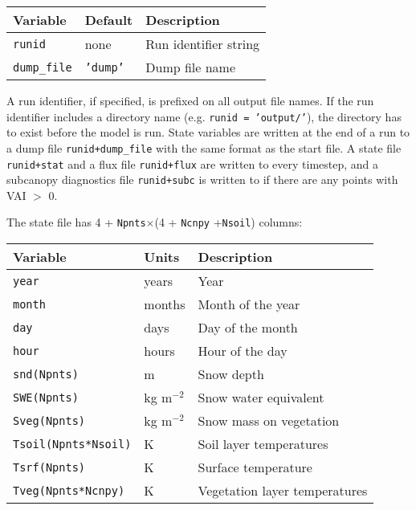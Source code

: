 \documentclass{article}
\begin{document}
\begin{longtable}{|l|l|l|}
\hline
Variable         & Default      & Description                            \\ \hline
{\tt runid}      & none         & Run identifier string                  \\
{\tt dump\_file} & {\tt 'dump'} & Dump file name                         \\ \hline 
\end{longtable}

A run identifier, if specified, is prefixed on all output file names. If the run identifier includes a directory name (e.g. {\tt runid = 'output/'}), the directory has to exist before the model is run. State variables are written at the end of a run to a dump file {\tt runid+dump\_file} with the same format as the start file. A state file {\tt runid+stat} and a flux file {\tt runid+flux} are written to every timestep, and a subcanopy diagnostics file {\tt runid+subc} is written to if there are any points with VAI $>$ 0.

The state file has 4 + {\tt Npnts}$\times$(4 + {\tt Ncnpy} +{\tt Nsoil}) columns:
\begin{longtable}{|l|l|l|} \hline
Variable                 & Units       & Description                   \\ \hline
{\tt year}               & years       & Year                          \\
{\tt month}              & months      & Month of the year             \\
{\tt day}                & days        & Day of the month              \\
{\tt hour}               & hours       & Hour of the day               \\
{\tt snd(Npnts)}         & m           & Snow depth                    \\
{\tt SWE(Npnts)}         & kg m$^{-2}$ & Snow water equivalent         \\
{\tt Sveg(Npnts)}        & kg m$^{-2}$ & Snow mass on vegetation       \\
{\tt Tsoil(Npnts*Nsoil)} & K           & Soil layer temperatures       \\
{\tt Tsrf(Npnts)}        & K           & Surface temperature           \\
{\tt Tveg(Npnts*Ncnpy)}  & K           & Vegetation layer temperatures \\ \hline 
\end{longtable}
\end{document}
